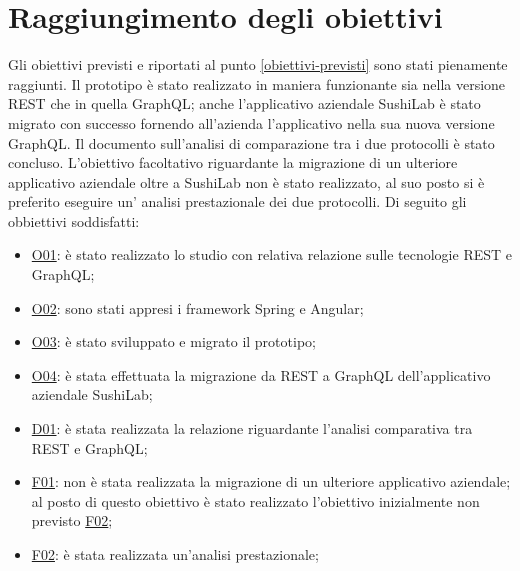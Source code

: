 \section{Raggiungimento degli obiettivi}
Gli obiettivi previsti e riportati al punto \ref{obiettivi-previsti} sono stati pienamente raggiunti. Il prototipo è stato realizzato in maniera funzionante sia nella versione REST che in quella GraphQL; anche l'applicativo aziendale SushiLab è stato migrato con successo fornendo all'azienda l'applicativo nella sua nuova versione GraphQL. Il documento sull'analisi di comparazione tra i due protocolli è stato concluso. L'obiettivo facoltativo riguardante la migrazione di un ulteriore applicativo aziendale oltre a SushiLab non è stato realizzato, al suo posto si è preferito eseguire un' analisi prestazionale dei due protocolli.
Di seguito gli obbiettivi soddisfatti:
\begin{itemize}
  \item \underline{O01}: è stato realizzato lo studio con relativa relazione sulle tecnologie REST e GraphQL;
  \item \underline{O02}: sono stati appresi i framework Spring e Angular;
  \item \underline{O03}: è stato sviluppato e migrato il prototipo;
  \item \underline{O04}: è stata effettuata la migrazione da REST a GraphQL dell'applicativo aziendale SushiLab;
  \item \underline{D01}: è stata realizzata la relazione riguardante l'analisi comparativa tra REST e GraphQL;
  \item \underline{F01}: non è stata realizzata la migrazione di un ulteriore applicativo aziendale; al posto di questo obiettivo è stato realizzato l'obiettivo inizialmente non previsto \underline{F02};
  \item \underline{F02}: è stata realizzata un'analisi prestazionale;
\end{itemize}
